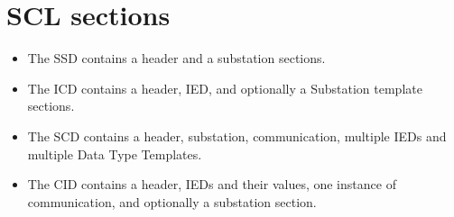 \section{SCL sections}

\begin{itemize}
  \item The SSD contains a header and a substation sections.
  \item The ICD contains a header, IED, and optionally a Substation template
  		sections.
  \item The SCD contains a header, substation, communication, multiple IEDs and 
  		multiple Data Type Templates.
  \item The CID contains a header, IEDs and their values, one instance 
  		of communication, and optionally a substation section. 
\end{itemize}
